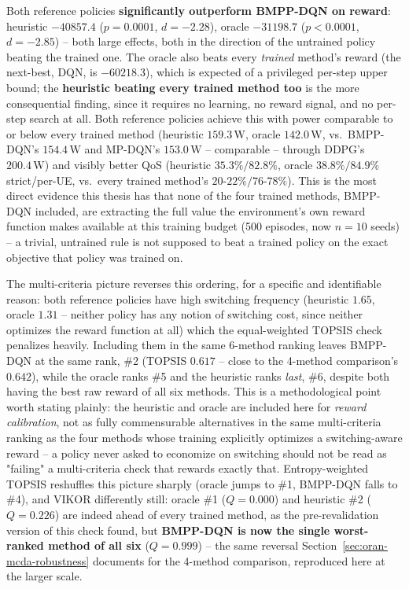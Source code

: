 

Both reference policies \textbf{significantly outperform BMPP-DQN on
reward}: heuristic $-40857.4$ ($p=0.0001$, $d=-2.28$), oracle $-31198.7$
($p<0.0001$, $d=-2.85$) -- both large effects, both in the direction of
the untrained policy beating the trained one. The oracle also beats every
\emph{trained} method's reward (the next-best, DQN, is $-60218.3$), which
is expected of a privileged per-step upper bound; the \textbf{heuristic
beating every trained method too} is the more consequential finding,
since it requires no learning, no reward signal, and no per-step search
at all. Both reference policies achieve this with power comparable to or
below every trained method (heuristic $159.3\,\mathrm{W}$, oracle
$142.0\,\mathrm{W}$, vs.\ BMPP-DQN's $154.4\,\mathrm{W}$ and MP-DQN's
$153.0\,\mathrm{W}$ -- comparable -- through DDPG's $200.4\,\mathrm{W}$)
and visibly better QoS (heuristic $35.3\%/82.8\%$, oracle $38.8\%/84.9\%$
strict/per-UE, vs.\ every trained method's $20$-$22\%/76$-$78\%$). This
is the most direct evidence this thesis has that none of the four
trained methods, BMPP-DQN included, are extracting the full value the
environment's own reward function makes available at this training
budget (500 episodes, now $n=10$ seeds) -- a trivial, untrained rule is
not supposed to beat a trained policy on the exact objective that policy
was trained on.



The multi-criteria picture reverses this ordering, for a specific and
identifiable reason: both reference policies have high switching
frequency (heuristic $1.65$, oracle $1.31$ -- neither policy has any
notion of switching cost, since neither optimizes the reward function at
all) which the equal-weighted TOPSIS check penalizes heavily. Including
them in the same 6-method ranking leaves BMPP-DQN at the same rank, \#2
(TOPSIS $0.617$ -- close to the 4-method comparison's $0.642$), while the
oracle ranks \#5 and the heuristic ranks \emph{last}, \#6, despite both
having the best raw reward of all six methods. This is a methodological
point worth stating plainly: the heuristic and oracle are included here
for \emph{reward calibration}, not as fully commensurable alternatives in
the same multi-criteria ranking as the four methods whose training
explicitly optimizes a switching-aware reward -- a policy never asked to
economize on switching should not be read as "failing" a multi-criteria
check that rewards exactly that. Entropy-weighted TOPSIS reshuffles this
picture sharply (oracle jumps to \#1, BMPP-DQN falls to \#4), and VIKOR
differently still: oracle \#1 ($Q=0.000$) and heuristic \#2 ($Q=0.226$)
are indeed ahead of every trained method, as the pre-revalidation version
of this check found, but \textbf{BMPP-DQN is now the single worst-ranked
method of all six} ($Q=0.999$) -- the same reversal
Section~\ref{sec:oran-mcda-robustness} documents for the 4-method
comparison, reproduced here at the larger scale.

